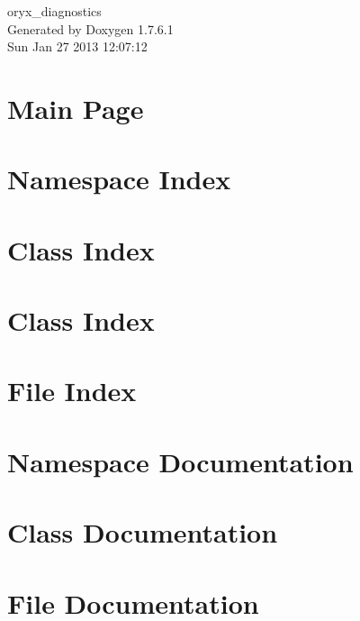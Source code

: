 \documentclass[a4paper]{book}
\begin{document}
\begin{titlepage}
\vspace*{7cm}
\begin{center}
{\Large oryx\-\_\-diagnostics }\\
\vspace*{1cm}
{\large \-Generated by Doxygen 1.7.6.1}\\
\vspace*{0.5cm}
{\small Sun Jan 27 2013 12:07:12}\\
\end{center}
\end{titlepage}
\clearemptydoublepage
{}
\tableofcontents
\clearemptydoublepage
{}
\chapter{\-Main \-Page}
\label{index}
\chapter{\-Namespace \-Index}

\chapter{\-Class \-Index}

\chapter{\-Class \-Index}

\chapter{\-File \-Index}

\chapter{\-Namespace \-Documentation}

\chapter{\-Class \-Documentation}






\chapter{\-File \-Documentation}







\printindex
\end{document}
